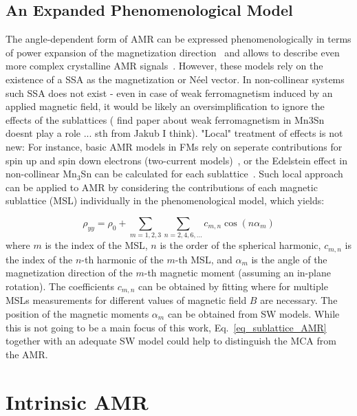 \documentclass[prb,showpacs,amsmath,amssymb,superscriptaddress,twocolumn,floatfix]{revtex4-1}
\begin{document}
\subsection{An Expanded Phenomenological Model}

The angle-dependent form of AMR can be expressed phenomenologically in terms of power expansion of the magnetization direction~\cite{Doring:1938,Limmer:2008,DeRanieri:2008} and allows to describe even more complex crystalline AMR signals~\cite{Ritzinger:2021, Gonzalez-Betancourt:2024, NamHai:2012}. However, these models rely on the existence of a SSA as the magnetization or N\'eel vector. In non-collinear systems such SSA does not exist - even in case of weak ferromagnetism induced by an applied magnetic field, it would be likely an oversimplification to ignore the effects of the sublattices ({\color{red} find paper about weak ferromagnetism in Mn3Sn doesnt play a role ... sth from Jakub I think}). "Local" treatment of effects is not new: For instance, basic AMR models in FMs rely on seperate contributions for spin up and spin down electrons (two-current models)~\cite{Ritzinger:2023}, or the Edelstein effect in non-collinear Mn$_3$Sn can be calculated for each sublattice~\cite{Gonzalez-Hernandez:2024}. Such local approach can be applied to AMR by considering the contributions of each magnetic sublattice (MSL) individually in the phenomenological model, which yields:

\begin{equation}
	\rho_{yy} = \rho_0 + \sum_{m = 1,2,3} \sum_{n = 2, 4, 6, ...} c_{m,n} \cos(n \alpha_m)
	\label{eq_sublattice_AMR}
\end{equation}
where $m$ is the index of the MSL, $n$ is the order of the spherical harmonic, $c_{m,n}$ is the index of the $n$-th harmonic of the $m$-th MSL, and $\alpha_m$ is the angle of the magnetization direction of the $m$-th magnetic moment (assuming an in-plane rotation). The coefficients $c_{m,n}$ can be obtained by fitting where for multiple MSLs measurements for different values of magnetic field $B$ are necessary. The position of the magnetic moments $\alpha_m$ can be obtained from SW models. While this is not going to be a main focus of this work, Eq.~\ref{eq_sublattice_AMR} together with an adequate SW model could help to distinguish the MCA from the AMR.









\section{Intrinsic AMR}
\label{sec_intrinsic}
\end{document}
